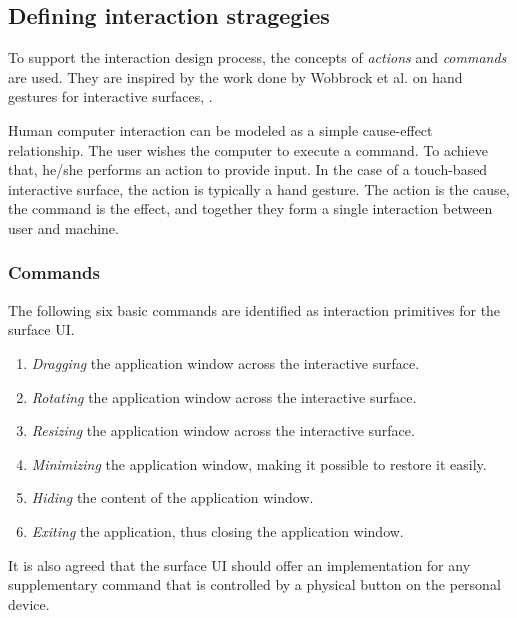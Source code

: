 
\subsection{Defining interaction stragegies}
\label{sec:strategies}

To support the interaction design process, the concepts of \emph{actions} and \emph{commands} are used.
They are inspired by the work done by Wobbrock et al. on hand gestures for interactive surfaces, \citep{Wobbrock:2009:gestures}.

Human computer interaction can be modeled as a simple cause-effect relationship.
The user wishes the computer to execute a command.
To achieve that, he/she performs an action to provide input.
In the case of a touch-based interactive surface, the action is typically a hand gesture.
The action is the cause, the command is the effect, and together they form a single interaction between user and machine.

\subsubsection{Commands}

The following six basic commands are identified as interaction primitives for the surface UI.

\begin{enumerate}
\item{\emph{Dragging} the application window across the interactive surface.}
\item{\emph{Rotating} the application window across the interactive surface.}
\item{\emph{Resizing} the application window across the interactive surface.}
\item{\emph{Minimizing} the application window, making it possible to restore it easily.}
\item{\emph{Hiding} the content of the application window.}
\item{\emph{Exiting} the application, thus closing the application window.}
\end{enumerate}

It is also agreed that the surface UI should offer an implementation for any supplementary command that is controlled by a physical button on the personal device.


